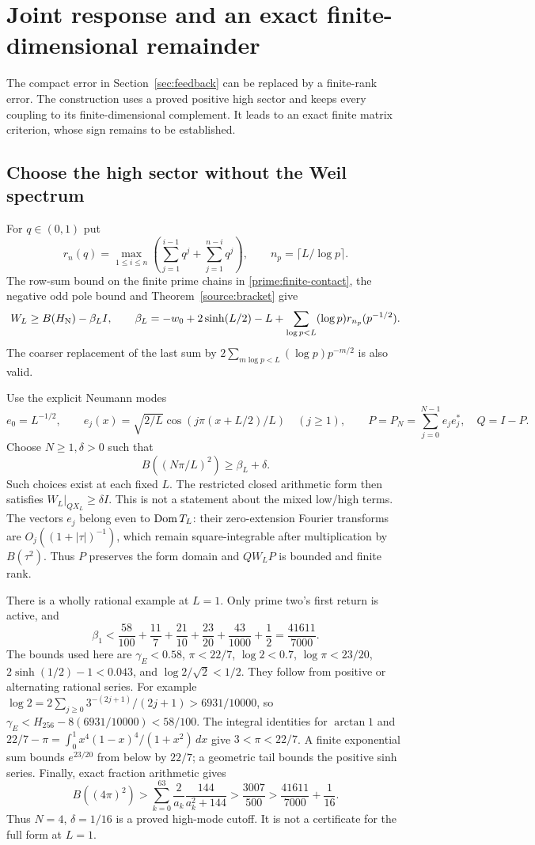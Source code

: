 \section{Joint response and an exact finite-dimensional remainder}
\label{sec:joint}
The compact error in Section~\ref{sec:feedback} can be replaced by a
finite-rank error. The construction uses a proved positive high
sector and keeps every coupling to its finite-dimensional
complement. It leads to an exact finite matrix criterion, whose
sign remains to be established.

\subsection{Choose the high sector without the Weil spectrum}
For $q\in(0,1)$ put
\[
r_n(q)=\max_{1\le i\le n}
 \left(\sum_{j=1}^{i-1}q^j+\sum_{j=1}^{n-i}q^j\right),\qquad
n_p=\lceil L/\log p\rceil.
\]
The row-sum bound on the finite prime chains in
\eqref{prime:finite-contact}, the negative odd pole bound and
Theorem~\ref{source:bracket} give
\begin{equation}\label{joint:beta}
W_L\ge B(H_{\rm N})-\beta_LI,\qquad
\beta_L=-w_0+2\sinh(L/2)-L+
 \sum_{\log p<L}(\log p)r_{n_p}(p^{-1/2}).
\end{equation}
The coarser replacement of the last sum by
$2\sum_{m\log p<L}(\log p)p^{-m/2}$ is also valid.

Use the explicit Neumann modes
\[
e_0=L^{-1/2},\qquad
e_j(x)=\sqrt{2/L}\cos(j\pi(x+L/2)/L)\quad(j\ge1),
\qquad P=P_N=\sum_{j=0}^{N-1}e_je_j^*,\quad Q=I-P.
\]
Choose $N\ge1,\delta>0$ such that
\begin{equation}\label{joint:cutoff}
B((N\pi/L)^2)\ge\beta_L+\delta.
\end{equation}
Such choices exist at each fixed $L$. The restricted closed
arithmetic form then satisfies $W_L|_{QX_L}\ge\delta I$.
This is not a statement about the mixed low/high terms.
The vectors $e_j$ belong even to $\operatorname{Dom} T_L$: their zero-extension
Fourier transforms are $O_j((1+|\tau|)^{-1})$, which remain
square-integrable after multiplication by $B(\tau^2)$.
Thus $P$ preserves the form domain and $QW_LP$ is bounded and
finite rank.

There is a wholly rational example at $L=1$. Only prime two's
first return is active, and
\[
\beta_1<
\frac{58}{100}+\frac{11}{7}+\frac{21}{10}+\frac{23}{20}
       +\frac{43}{1000}+\frac12
=\frac{41611}{7000}.
\]
The bounds used here are
$\gamma_{\!E}<0.58$, $\pi<22/7$, $\log2<0.7$,
$\log\pi<23/20$, $2\sinh(1/2)-1<0.043$, and
$\log2/\sqrt2<1/2$. They follow from positive or alternating
rational series. For example
$\log2=2\sum_{j\ge0}3^{-(2j+1)}/(2j+1)>6931/10000$,
so $\gamma_{\!E}<H_{256}-8(6931/10000)<58/100$.
The integral identities for $\arctan1$ and
$22/7-\pi=\int_0^1x^4(1-x)^4/(1+x^2)\,dx$ give $3<\pi<22/7$.
A finite exponential sum bounds $e^{23/20}$ from below by $22/7$;
a geometric tail bounds the positive sinh series.
Finally, exact fraction arithmetic gives
\[
B((4\pi)^2)>
\sum_{k=0}^{63}\frac2{a_k}\frac{144}{a_k^2+144}
>\frac{3007}{500}>
\frac{41611}{7000}+\frac1{16}.
\]
Thus $N=4$, $\delta=1/16$ is a proved high-mode cutoff.
It is not a certificate for the full form at $L=1$.

